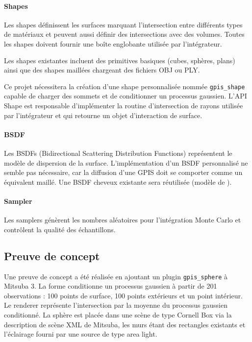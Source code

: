 \paragraph{Shapes}
Les shapes définissent les surfaces marquant l'intersection entre différents types de matériaux et peuvent aussi définir des intersections avec des volumes. Toutes les shapes doivent fournir une boîte englobante utilisée par l'intégrateur.

Les shapes existantes incluent des primitives basiques (cubes, sphères, plans) ainsi que des shapes maillées chargeant des fichiers OBJ ou PLY.

Ce projet nécessitera la création d'une shape personnalisée nommée \texttt{gpis\_shape} capable de charger des sommets et de conditionner un processus gaussien. L'API Shape est responsable d'implémenter la routine d'intersection de rayons utilisée par l'intégrateur et qui retourne un objet d'interaction de surface.

\paragraph{BSDF}
Les BSDFs (Bidirectional Scattering Distribution Functions) représentent le modèle de dispersion de la surface. L'implémentation d'un BSDF personnalisé ne semble pas nécessaire, car la diffusion d'une GPIS doit se comporter comme un équivalent maillé. Une BSDF cheveux existante sera réutilisée (modèle de \textcite{chiang2016}).

\paragraph{Sampler}
Les samplers génèrent les nombres aléatoires pour l'intégration Monte Carlo et contrôlent la qualité des échantillons.

\subsection{Preuve de concept}
Une preuve de concept a été réalisée en ajoutant un plugin \texttt{gpis\_sphere} à Mitsuba 3. La forme conditionne un processus gaussien à partir de 201 observations : 100 points de surface, 100 points extérieurs et un point intérieur. Le renderer représente l'intersection par la moyenne du processus gaussien conditionné. La sphère est placée dans une scène de type Cornell Box via la description de scène XML de Mitsuba, les murs étant des rectangles existants et l'éclairage fourni par une source de type area light.

